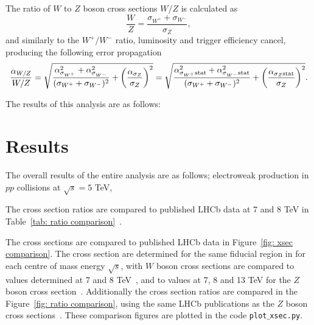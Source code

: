 \documentclass[a4paper]{article}
\begin{document}
The ratio of $W$ to $Z$ boson cross sections $W/Z$ is calculated as
\begin{equation}
    \frac{W}{Z} = \frac{\sigma_{W^+} + \sigma_{W^-}}{\sigma_{Z}},
\end{equation}
and similarly to the $W^+/W^-$ ratio, luminosity and trigger efficiency cancel, producing the following error propagation
\begin{equation}
    \frac{\alpha_{W/Z}}{W/Z} = \sqrt{\frac{\alpha_{\sigma_{W^+}}^2+\alpha_{\sigma_{W^-}}^2}{(\sigma_{W^+}+\sigma_{W^-})^2} + \left(\frac{\alpha_{\sigma_{Z}}}{\sigma_{Z}}\right)^2} = \sqrt{\frac{\alpha_{\sigma_{W^+} \rm stat }^2+\alpha_{\sigma_{W^-} \rm stat}^2}{(\sigma_{W^+}+\sigma_{W^-})^2} + \left(\frac{\alpha_{\sigma_{Z}\rm stat}}{\sigma_{Z}}\right)^2}.
\end{equation}

The results of this analysis are as follows:





\section{Results}
The overall results of the entire analysis are as follows; electroweak production in $pp$ collisions at $\sqrt{s}=5$ TeV,






The cross section ratios are compared to published LHCb data at 7 and 8 TeV in Table~\ref{tab: ratio comparison}~\cite{7TeV_W_2014,7TeV_Z_2015,8TeV_W+Z_2015}.

The cross sections are compared to published LHCb data in Figure~\ref{fig: xsec comparison}. The cross section are determined for the same fiducial region in for each centre of mass energy $\sqrt{s}$, with $W$ boson cross sections are compared to values determined at 7 and 8 TeV~\cite{7TeV_W_2014,8TeV_W+Z_2015}, and to values at 7, 8 and 13 TeV for the $Z$ boson cross section~\cite{7TeV_Z_2015,8TeV_W+Z_2015,13TeV_Z_2016}.
Additionally the cross section ratios are compared in the Figure~\ref{fig: ratio comparison}, using the same LHCb publications as the $Z$ boson cross sections~\cite{7TeV_Z_2015,8TeV_W+Z_2015}.
These comparison figures are plotted in the code \texttt{plot$\_$xsec.py}.
\end{document}
